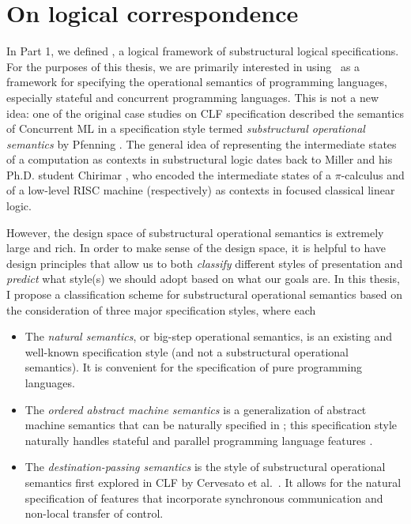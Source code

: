 \chapter{On logical correspondence}

In Part 1, we defined \sls, a logical framework of substructural
logical specifications. For the purposes of this thesis, we are
primarily interested in using \sls~as a framework for specifying the
operational semantics of programming languages, especially stateful
and concurrent programming languages. This is not a new idea: one of
the original case studies on CLF specification described the semantics
of Concurrent ML \cite{cervesato02concurrent} in a specification style
termed {\it substructural operational semantics} by Pfenning
\cite{pfenning04substructural}. The general idea of representing the
intermediate states of a computation as contexts in substructural
logic dates back to Miller \cite{miller92pi} and his Ph.D. student
Chirimar \cite{chirimar95proof}, who encoded the intermediate states
of a $\pi$-calculus and of a low-level RISC machine (respectively) as
contexts in focused classical linear logic.

However, the design space of substructural operational semantics is
extremely large and rich. In order to make sense of the design space,
it is helpful to have design principles that allow us to both {\it
  classify} different styles of presentation and {\it predict} what
style(s) we should adopt based on what our goals are. In this thesis,
I propose a classification scheme for substructural operational
semantics based on the consideration of three major specification styles,
where each 

\begin{itemize}
\item The {\it natural semantics}, or big-step operational semantics,
  is an existing and well-known specification style (and not a
  substructural operational semantics). It is convenient for the
  specification of pure programming languages.

\item The {\it ordered abstract machine semantics} is a generalization
  of abstract machine semantics that can be naturally specified in
  \sls; this specification style naturally handles stateful and
  parallel programming language features
  \cite{pfenning09substructural}.

\item The {\it destination-passing semantics} is the style of
  substructural operational semantics first explored in CLF by
  Cervesato et al.~\cite{cervesato02concurrent}. It allows for the
  natural specification of features that incorporate synchronous
  communication and non-local transfer of control.
\end{itemize}

